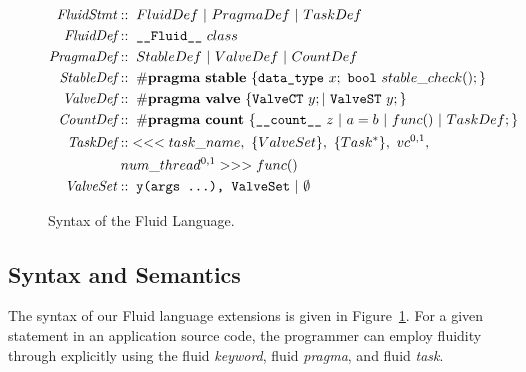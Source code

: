 \begin{figure}[ht]\vspace{-8pt}
\scriptsize
\begin{align*}
\text{\em FluidStmt} &::\;  FluidDef \ |\ PragmaDef \ |\ TaskDef \\ 
\text{\em FluidDef} &::\; \texttt{\_\_Fluid\_\_} \ class\ \\%
\text{\em PragmaDef} &::\; StableDef\ |\ ValveDef\ |\ CountDef \\
\text{\em StableDef} &::\; {\bf\#pragma}\ {\bf stable}\ \{\texttt{data\_type} \ x;\ \texttt{bool} \ stable\_check();\}\\
\text{\em ValveDef} &::\; {\bf\#pragma}\ {\bf valve}\ \{\texttt{ValveCT} \ y; |\  \texttt{ValveST} \ y;\} \\
\text{\em CountDef} &::\; {\bf \#pragma}\ {\bf count}\ \{\texttt{\_\_count\_\_}\  z\ |\ a = b\ |\ func()\ |\ TaskDef;\}\\
\text{\em TaskDef} &::\; <<<task\_name,\ \{ValveSet\},\ \{Task^{*}\},\ vc^{0,1},\\
&\; num\_thread^{0,1}>>>func()\\
\text{\em ValveSet} &::\; \texttt{y(args ...), ValveSet}\ |\ \texttt{$\emptyset$}
\end{align*}\vspace{-20pt}\caption{Syntax of the Fluid Language.}
\label{figs:syntax}\vspace{-16pt}
\end{figure}

\subsection{Syntax and Semantics}
\label{ssec:formal}
The syntax of our Fluid language extensions is given in Figure~\ref{figs:syntax}. For a given statement in an application source code, the programmer can employ fluidity through explicitly using the fluid {\it keyword}, fluid {\it pragma}, and fluid {\it task}. 

